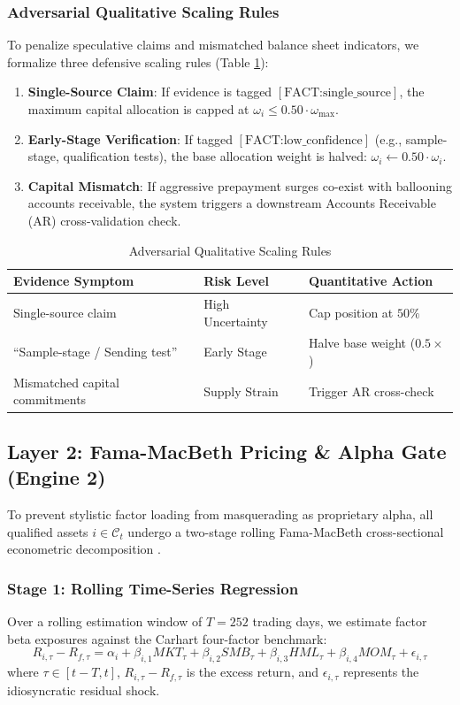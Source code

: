 \documentclass[journal,10pt,twocolumn]{IEEEtran}
\begin{document}
\subsubsection{Adversarial Qualitative Scaling Rules}
To penalize speculative claims and mismatched balance sheet indicators, we formalize three defensive scaling rules (Table \ref{tab:adversarial}):
\begin{enumerate}
    \item \textbf{Single-Source Claim}: If evidence is tagged $[\text{FACT:single\_source}]$, the maximum capital allocation is capped at $\omega_i \le 0.50 \cdot \omega_{\max}$.
    \item \textbf{Early-Stage Verification}: If tagged $[\text{FACT:low\_confidence}]$ (e.g., sample-stage, qualification tests), the base allocation weight is halved: $\omega_i \leftarrow 0.50 \cdot \omega_i$.
    \item \textbf{Capital Mismatch}: If aggressive prepayment surges co-exist with ballooning accounts receivable, the system triggers a downstream Accounts Receivable (AR) cross-validation check.
\end{enumerate}

\begin{table}[h]
\centering
\caption{Adversarial Qualitative Scaling Rules}
\label{tab:adversarial}
\begin{tabular}{lll}
\toprule
\textbf{Evidence Symptom} & \textbf{Risk Level} & \textbf{Quantitative Action} \\
\midrule
Single-source claim & High Uncertainty & Cap position at $50\%$ \\
``Sample-stage / Sending test'' & Early Stage & Halve base weight ($0.5\times$) \\
Mismatched capital commitments & Supply Strain & Trigger AR cross-check \\
\bottomrule
\end{tabular}
\end{table}

\subsection{Layer 2: Fama-MacBeth Pricing \& Alpha Gate (Engine 2)}
To prevent stylistic factor loading from masquerading as proprietary alpha, all qualified assets $i \in \mathcal{C}_t$ undergo a two-stage rolling Fama-MacBeth cross-sectional econometric decomposition \cite{fama1973risk}.

\subsubsection{Stage 1: Rolling Time-Series Regression}
Over a rolling estimation window of $T = 252$ trading days, we estimate factor beta exposures against the Carhart four-factor benchmark:
\begin{equation}
R_{i,\tau} - R_{f,\tau} = \alpha_i + \beta_{i,1}MKT_\tau + \beta_{i,2}SMB_\tau + \beta_{i,3}HML_\tau + \beta_{i,4}MOM_\tau + \epsilon_{i,\tau}
\label{eq:stage1}
\end{equation}
where $\tau \in [t-T, t]$, $R_{i,\tau} - R_{f,\tau}$ is the excess return, and $\epsilon_{i,\tau}$ represents the idiosyncratic residual shock.
\end{document}
